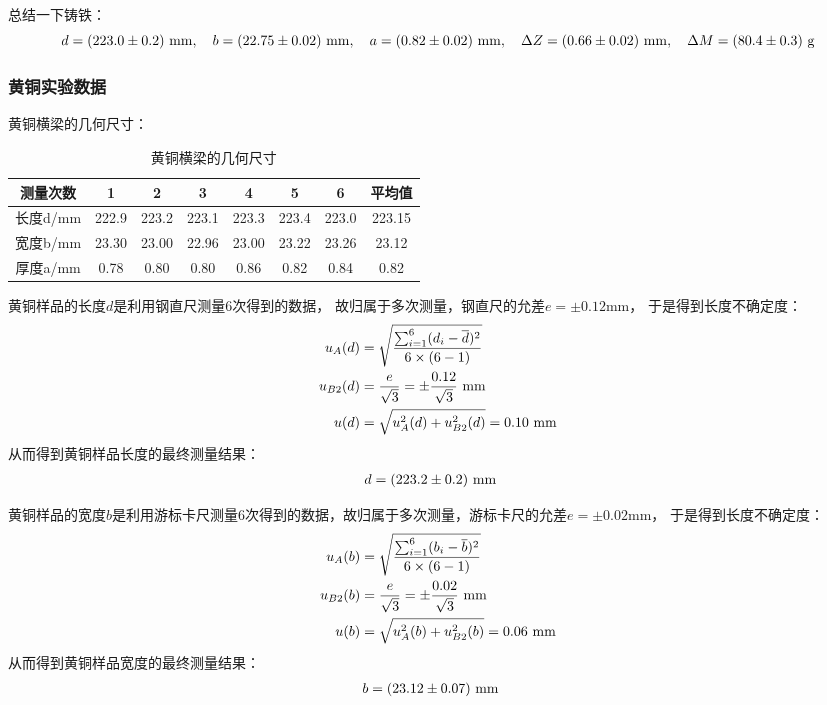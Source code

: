 \documentclass[11pt]{article}
\begin{document}
	总结一下铸铁：
	\[d=(223.0\pm 0.2)\,\, {\rm mm},\quad b=(22.75\pm 0.02)\,\, {\rm mm}, \quad a=(0.82\pm 0.02)\,\, {\rm mm},\quad \Delta Z = (0.66 \pm 0.02) \ \mathrm{mm},\quad
	\Delta M = (80.4 \pm 0.3) \ \mathrm{g}\]
	
	\subsubsection{黄铜实验数据}
	黄铜横梁的几何尺寸：
	\begin{table}[H]
		\centering
		\caption{黄铜横梁的几何尺寸}
		\begin{tabular}{cccccccc}
			\toprule
			测量次数 & 1 & 2 & 3 & 4 & 5 & 6 & 平均值 \\ 
			\midrule
			长度d/mm & 222.9 & 223.2 & 223.1 & 223.3 & 223.4 & 223.0 & 223.15\\ 
			宽度b/mm & 23.30 & 23.00 & 22.96 & 23.00 & 23.22 & 23.26 & 23.12 \\ 
			厚度a/mm & 0.78 & 0.80 & 0.80 & 0.86 & 0.82 & 0.84 & 0.82  \\ 
			\bottomrule
		\end{tabular}
	\end{table}
	
	黄铜样品的长度$d$是利用钢直尺测量6次得到的数据，
	故归属于多次测量，钢直尺的允差$e=\pm 0.12$mm，
	于是得到长度不确定度：
	\begin{align*}
		u_A(d)&=\sqrt{\frac{\sum_{i=1}^6(d_i-\overline d)^2}{6\times(6-1)}}\\
		u_{B2}(d)&=\frac{e}{\sqrt 3}=\pm \frac{0.12}{\sqrt 3} \,\,{\rm mm}\\
		u(d)&=
		\sqrt{u_{A}^2(d)+u^2_{B2}(d)} 
		=0.10 \,\,{\rm mm}
	\end{align*}
	从而得到黄铜样品长度的最终测量结果：
	\begin{align*}
		d&=(223.2\pm 0.2)\,\, {\rm mm} 
	\end{align*}
	
	
	黄铜样品的宽度$b$是利用游标卡尺测量6次得到的数据，故归属于多次测量，游标卡尺的允差$e=\pm 0.02$mm，
	于是得到长度不确定度：
	\begin{align*}
		u_A(b)&=\sqrt{\frac{\sum_{i=1}^6(b_i-\overline b)^2}{6\times(6-1)}}\\
		u_{B2}(b)&=\frac{e}{\sqrt 3}=\pm \frac{0.02}{\sqrt 3} \,\,{\rm mm}\\
		u(b) &=
		\sqrt{u_{A}^2(b)+u^2_{B2}(b)} 
		=0.06 \,\,{\rm mm}
	\end{align*}
	从而得到黄铜样品宽度的最终测量结果：
	\begin{align*}
		b&=(23.12\pm 0.07)\,\, {\rm mm} 
	\end{align*}
	
\end{document}

